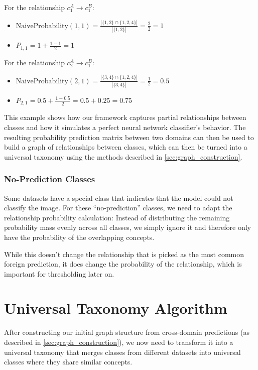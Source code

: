 For the relationship $c^A_1 \rightarrow c^B_1$:
\begin{itemize}
    \item $\text{NaiveProbability}(1,1) = \frac{|\{1,2\} \cap \{1,2,4\}|}{|\{1,2\}|} = \frac{2}{2} = 1$
    \item $P_{1,1} = 1 + \frac{1-1}{2} = 1$
\end{itemize}

For the relationship $c^A_2 \rightarrow c^B_1$:
\begin{itemize}
    \item $\text{NaiveProbability}(2,1) = \frac{|\{3,4\} \cap \{1,2,4\}|}{|\{3,4\}|} = \frac{1}{2} = 0.5$
    \item $P_{2,1} = 0.5 + \frac{1-0.5}{2} = 0.5 + 0.25 = 0.75$
\end{itemize}

This example shows how our framework captures partial relationships between classes
and how it simulates a perfect neural network classifier's behavior.
The resulting probability prediction matrix between two domains can then be used
to build a graph of relationships between classes,
which can then be turned into a universal taxonomy using the methods described in \autoref{sec:graph_construction}.

\subsubsection{No-Prediction Classes}

Some datasets have a special class that indicates that the model could not classify the image.
For these \enquote{no-prediction} classes, we need to adapt the relationship probability calculation:
Instead of distributing the remaining probability mass evenly across all classes,
we simply ignore it and therefore only have the probability of the overlapping concepts.

While this doesn't change the relationship that is picked as the most common foreign prediction,
it does change the probability of the relationship, which is important for thresholding later on.

\section{Universal Taxonomy Algorithm}

After constructing our initial graph structure from cross-domain predictions (as described in \autoref{sec:graph_construction}), we now need to transform it into a universal taxonomy
that merges classes from different datasets into universal classes where they share similar concepts.

